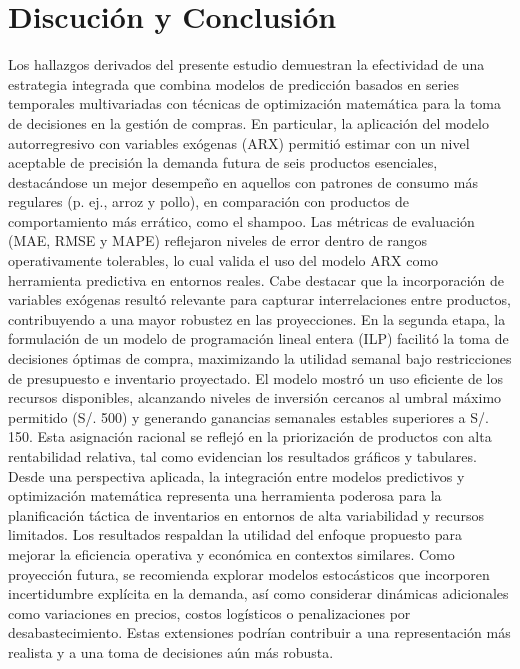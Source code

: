 \documentclass[12pt]{article}
\begin{document}
\section{Discución y Conclusión}
Los hallazgos derivados del presente estudio demuestran la efectividad de una estrategia integrada que combina modelos de predicción basados en series temporales multivariadas con técnicas de optimización matemática para la toma de decisiones en la gestión de compras. En particular, la aplicación del modelo autorregresivo con variables exógenas (ARX) permitió estimar con un nivel aceptable de precisión la demanda futura de seis productos esenciales, destacándose un mejor desempeño en aquellos con patrones de consumo más regulares (p. ej., arroz y pollo), en comparación con productos de comportamiento más errático, como el shampoo.
\vspace{0.4cm}
Las métricas de evaluación (MAE, RMSE y MAPE) reflejaron niveles de error dentro de rangos operativamente tolerables, lo cual valida el uso del modelo ARX como herramienta predictiva en entornos reales. Cabe destacar que la incorporación de variables exógenas resultó relevante para capturar interrelaciones entre productos, contribuyendo a una mayor robustez en las proyecciones.
\vspace{0.4cm}
En la segunda etapa, la formulación de un modelo de programación lineal entera (ILP) facilitó la toma de decisiones óptimas de compra, maximizando la utilidad semanal bajo restricciones de presupuesto e inventario proyectado. El modelo mostró un uso eficiente de los recursos disponibles, alcanzando niveles de inversión cercanos al umbral máximo permitido (S/. 500) y generando ganancias semanales estables superiores a S/. 150. Esta asignación racional se reflejó en la priorización de productos con alta rentabilidad relativa, tal como evidencian los resultados gráficos y tabulares.
\vspace{0.4cm}
Desde una perspectiva aplicada, la integración entre modelos predictivos y optimización matemática representa una herramienta poderosa para la planificación táctica de inventarios en entornos de alta variabilidad y recursos limitados. Los resultados respaldan la utilidad del enfoque propuesto para mejorar la eficiencia operativa y económica en contextos similares.
\vspace{0.4cm}
Como proyección futura, se recomienda explorar modelos estocásticos que incorporen incertidumbre explícita en la demanda, así como considerar dinámicas adicionales como variaciones en precios, costos logísticos o penalizaciones por desabastecimiento. Estas extensiones podrían contribuir a una representación más realista y a una toma de decisiones aún más robusta.
\end{document}
